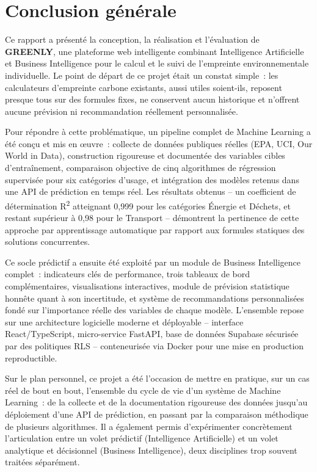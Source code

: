 \chapter*{Conclusion générale}

Ce rapport a présenté la conception, la réalisation et l'évaluation de \textbf{GREENLY}, une plateforme web intelligente combinant Intelligence Artificielle et Business Intelligence pour le calcul et le suivi de l'empreinte environnementale individuelle. Le point de départ de ce projet était un constat simple~: les calculateurs d'empreinte carbone existants, aussi utiles soient-ils, reposent presque tous sur des formules fixes, ne conservent aucun historique et n'offrent aucune prévision ni recommandation réellement personnalisée.

Pour répondre à cette problématique, un pipeline complet de Machine Learning a été conçu et mis en œuvre~: collecte de données publiques réelles (EPA, UCI, Our World in Data), construction rigoureuse et documentée des variables cibles d'entraînement, comparaison objective de cinq algorithmes de régression supervisée pour six catégories d'usage, et intégration des modèles retenus dans une API de prédiction en temps réel. Les résultats obtenus -- un coefficient de détermination R\textsuperscript{2} atteignant 0,999 pour les catégories Énergie et Déchets, et restant supérieur à 0,98 pour le Transport -- démontrent la pertinence de cette approche par apprentissage automatique par rapport aux formules statiques des solutions concurrentes.

Ce socle prédictif a ensuite été exploité par un module de Business Intelligence complet~: indicateurs clés de performance, trois tableaux de bord complémentaires, visualisations interactives, module de prévision statistique honnête quant à son incertitude, et système de recommandations personnalisées fondé sur l'importance réelle des variables de chaque modèle. L'ensemble repose sur une architecture logicielle moderne et déployable -- interface React/TypeScript, micro-service FastAPI, base de données Supabase sécurisée par des politiques RLS -- conteneurisée via Docker pour une mise en production reproductible.

Sur le plan personnel, ce projet a été l'occasion de mettre en pratique, sur un cas réel de bout en bout, l'ensemble du cycle de vie d'un système de Machine Learning~: de la collecte et de la documentation rigoureuse des données jusqu'au déploiement d'une API de prédiction, en passant par la comparaison méthodique de plusieurs algorithmes. Il a également permis d'expérimenter concrètement l'articulation entre un volet prédictif (Intelligence Artificielle) et un volet analytique et décisionnel (Business Intelligence), deux disciplines trop souvent traitées séparément.

